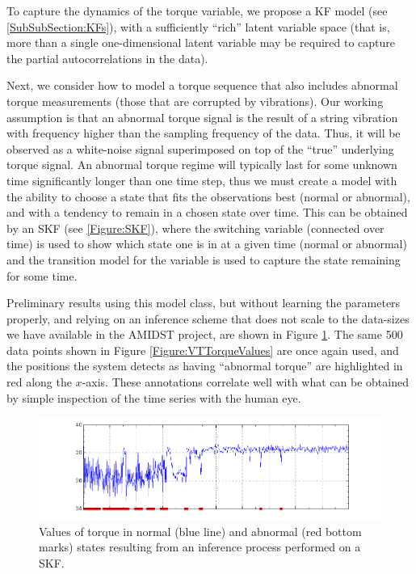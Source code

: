 To capture the dynamics of the torque variable, we propose a KF model (see \ref{SubSubSection:KFs}), with a sufficiently ``rich'' latent variable space (that is, more than a single one-dimensional latent variable may be required to capture the partial autocorrelations in the data). 

Next, we consider how to model a torque sequence that also includes abnormal torque measurements (those that are corrupted by vibrations). Our working assumption is that an abnormal torque signal is the result of a string vibration with frequency higher than the sampling frequency of the data. Thus, it will be observed as a white-noise signal superimposed on top of the ``true'' underlying torque signal. An abnormal torque regime will typically last for some unknown time significantly longer than one time step, thus we must create a model with the ability to choose a state that fits the observations best (normal or abnormal), and with a tendency to remain in a chosen state over time. This can be obtained by an SKF (see \ref{Figure:SKF}), where the switching variable (connected over time) is used to show which state one is in at a given time (normal or abnormal) and the transition model for the variable is used to capture the state remaining for some time. 

Preliminary results using this model class, but without learning the parameters properly, and relying on an inference scheme that does not scale to the data-sizes we have available in the AMIDST project, are shown in Figure \ref{Figure:VTEraticTorqueMarked}. The same 500 data points shown  in Figure \ref{Figure:VTTorqueValues} are once again used, and the positions the system detects as having ``abnormal torque'' are highlighted in red along the $x$-axis. These annotations correlate well with what can be obtained by simple inspection of the time series with the human eye. 

\begin{figure}[ht!]
\begin{center}
\includegraphics[scale=0.3]{./figures/VT_ErraticTRQ_marked} 
\caption{\label{Figure:VTEraticTorqueMarked} Values of torque in normal (blue line) and abnormal (red bottom marks) states resulting from an inference process performed on a SKF.}
\end{center}
\end{figure}

